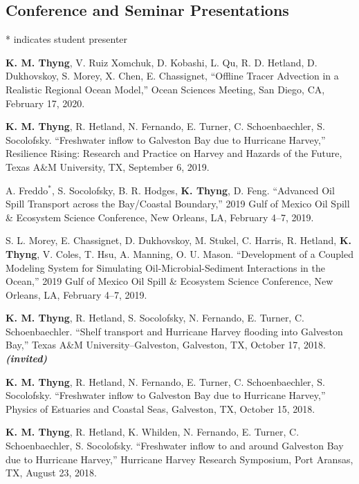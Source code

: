 \documentclass[10pt,letterpaper]{article}
\newcommand{\kmt}{\textbf{K. M. Thyng}}
\newcommand{\kt}{\textbf{K. Thyng}}
\newcommand{\inv}{\textbf{\textit{(invited)}}}
\renewenvironment{itemize}{
  \begin{list}{}{
    \setlength{\leftmargin}{1.5em}
    \setlength{\itemsep}{0.25em}
    \setlength{\parskip}{0pt}
    \setlength{\parsep}{0.25em}
  }
}{
  \end{list}
}
\begin{document}
\subsection*{Conference and Seminar Presentations}
* indicates student presenter
\begin{itemize}

\item \kmt, V. Ruiz Xomchuk, D. Kobashi, L. Qu, R. D. Hetland, D. Dukhovskoy, S. Morey, X. Chen, E. Chassignet, ``Offline Tracer Advection in a Realistic Regional Ocean Model,'' Ocean Sciences Meeting, San Diego, CA, February 17, 2020.

\item \kmt, R. Hetland, N. Fernando, E. Turner, C. Schoenbaechler, S. Socolofsky. ``Freshwater inflow to Galveston Bay due to Hurricane Harvey,'' Resilience Rising: Research and Practice on Harvey and Hazards of the Future, Texas A\&M University, TX, September 6, 2019.

\item A. Freddo$^*$, S. Socolofsky, B. R. Hodges, \kt, D. Feng. ``Advanced Oil Spill Transport across the Bay/Coastal Boundary,'' 2019 Gulf of Mexico Oil Spill \& Ecosystem Science Conference, New Orleans, LA, February 4--7, 2019.

\item S. L. Morey, E. Chassignet, D. Dukhovskoy, M. Stukel, C. Harris, R. Hetland, \kt, V. Coles, T. Hsu, A. Manning, O. U. Mason. ``Development of a Coupled Modeling System for Simulating Oil-Microbial-Sediment
Interactions in the Ocean,'' 2019 Gulf of Mexico Oil Spill \& Ecosystem Science Conference, New Orleans, LA, February 4--7, 2019.

\item \kmt, R. Hetland, S. Socolofsky, N. Fernando, E. Turner, C. Schoenbaechler. ``Shelf transport and Hurricane Harvey flooding into Galveston Bay,'' Texas A\&M University--Galveston, Galveston, TX, October 17, 2018. \inv

\item \kmt, R. Hetland, N. Fernando, E. Turner, C. Schoenbaechler, S. Socolofsky. ``Freshwater inflow to Galveston Bay due to Hurricane Harvey,'' Physics of Estuaries and Coastal Seas, Galveston, TX, October 15, 2018.

\item \kmt, R. Hetland, K. Whilden, N. Fernando, E. Turner, C. Schoenbaechler, S. Socolofsky. ``Freshwater inflow to and around Galveston Bay due to Hurricane Harvey,'' Hurricane Harvey Research Symposium, Port Aransas, TX, August 23, 2018.


\end{itemize}
\end{document}
